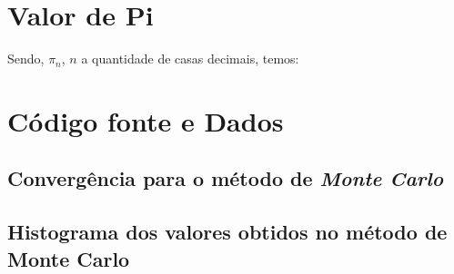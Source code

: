 \begin{appendixenv}[Apêndices]
    \section{Valor de Pi} \label{apx:pi-number}

    Sendo, $\pi_n$, $n$ a quantidade de casas decimais, temos:

    

    \cleardoublepage
    \section{Código fonte e Dados} \label{apx:source-code}

    \subsection{Convergência para o método de \textit{Monte Carlo}}
    \label{sec:convergence_coding_at_monte_carlo}
    
    
    
    \newpage
    
    \subsection{Histograma dos valores obtidos no método de Monte Carlo}
    \label{sec:histogram_coding_at_monte_carlo}
    
    
    
    \newpage
    
    \end{appendixenv}